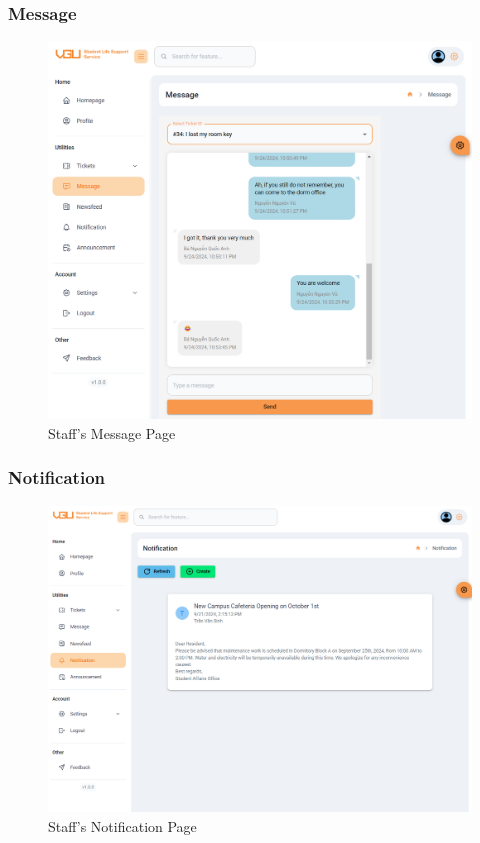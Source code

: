 	
	\subsubsection{Message}
	\begin{figure}[H]
		\centering
		\includegraphics[width=1\linewidth]{graphics/gui/staff/message}
		\caption{Staff's Message Page}
		\label{fig:gui-st-message}
	\end{figure}
	
	\subsubsection{Notification}
	\begin{figure}[H]
		\centering
		\includegraphics[width=1\linewidth]{graphics/gui/staff/notification}
		\caption{Staff's Notification Page}
		\label{fig:gui-st-notification}
	\end{figure}
	
